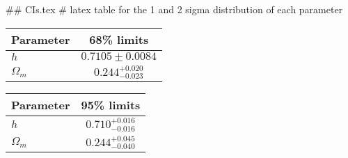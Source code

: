 ## CIs.tex
# latex table for the 1 and 2 sigma distribution of each parameter

\begin{tabular} { l  c}
 Parameter &  68\% limits\\
\hline
{\boldmath$h              $} & $0.7105\pm 0.0084          $\\
{\boldmath$\Omega_m       $} & $0.244^{+0.020}_{-0.023}   $\\
\hline
\end{tabular}

\begin{tabular} { l  c}
 Parameter &  95\% limits\\
\hline
{\boldmath$h              $} & $0.710^{+0.016}_{-0.016}   $\\
{\boldmath$\Omega_m       $} & $0.244^{+0.045}_{-0.040}   $\\
\hline
\end{tabular}
